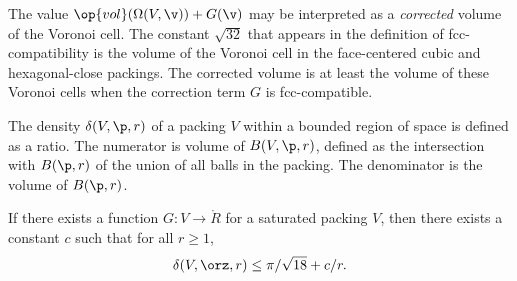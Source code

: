 \begin{remark}
The value $\op{vol}(\Omega(V,\v)) + G(\v)$ may be interpreted as a
{\it corrected\/} volume of the Voronoi cell. The constant
$\sqrt{32}$ that appears in the definition of fcc-compatibility is
the volume of the Voronoi cell in the face-centered cubic and
hexagonal-close packings.  The corrected volume is at least the
volume of these Voronoi cells when the correction term $G$ is
fcc-compatible.  %
\end{remark}




The density $\delta( V,\p,r)$ of a packing $ V$ within a bounded
region of space is defined as a ratio. The numerator is volume of
$B(V,\p,r)$, defined as the intersection with $B(\p,r)$ of the union
of all balls in the packing.  The denominator is the volume of
$B(\p,r)$. 
%
%


\begin{lemma}[] 
\label{lemma:deltabound} If there exists a 
  function
$G: V\to\ring{R}$ for a saturated 
packing $ V$, then there
exists a constant $c$ such that for all $r\ge1$,
\begin{displaymath} 
\delta( V,\orz,r)
\le \pi/\sqrt{18} + c/r.
\end{displaymath}
\end{lemma}




